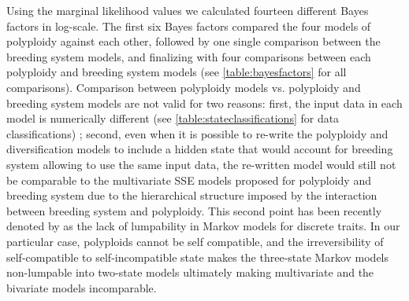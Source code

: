 Using the marginal likelihood values we calculated fourteen different Bayes factors in log-scale. The first six Bayes factors compared the four models of polyploidy against each other, followed by one single comparison between the breeding system models, and finalizing with four comparisons between each polyploidy and breeding system models (see \cref{table:bayesfactors} for all comparisons). Comparison between polyploidy models vs. polyploidy and breeding system models are not valid for two reasons: first, the input data in each model is numerically different (see \cref{table:stateclassifications} for data classifications)
; second, even when it is possible to re-write the polyploidy and diversification models to include a hidden state that would account for breeding system allowing to use the same input data, the re-written model would still not be comparable to the multivariate SSE models proposed for polyploidy and breeding system due to the hierarchical structure imposed by the interaction between breeding system and polyploidy. This second point has been recently denoted by \citet{tarasov_2019} as the lack of lumpability in Markov models for discrete traits.  In our particular case, polyploids cannot be self compatible, and the irreversibility of self-compatible to self-incompatible state makes the three-state Markov models non-lumpable into two-state models ultimately making  multivariate and the bivariate models incomparable.




